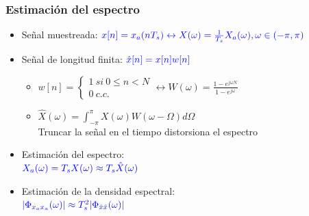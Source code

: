 \begin{frame} 
  \frametitle{Estimación del espectro}

    \begin{itemize}
      \item Señal muestreada: $\color{blue}x[n]=x_a(nT_s) \leftrightarrow X(\omega)=\frac{1}{T_s}X_a(\omega), \omega\in(-\pi,\pi)$ \vspace{0.2cm}
      \item Señal de longitud finita: $\color{blue}\hat{x}[n]=x[n]w[n]\color{black}$ \vspace{0.2cm}
      \begin{itemize}
        \item $w[n]=\left\{ \begin{matrix}1~si~0\leq n< N\\ 0~c.c.\end{matrix} \right. \leftrightarrow W(\omega)=\frac{1-e^{j\omega N}}{1-e^{j\omega}}$
        \item $\hat{X}(\omega)=\int_{-\pi}^{\pi}X(\omega)W(\omega-\Omega)d\Omega$ \\ \vspace{0.1cm}
        \alert{Truncar la señal en el tiempo distorsiona el espectro}
      \end{itemize} \vspace{0.2cm}
      \item Estimación del espectro:\\ $\color{blue}X_a(\omega)=T_s X(\omega)\approx T_s \hat{X}(\omega)\color{black}$ \vspace{0.2cm} 
      \item Estimación de la densidad espectral:\\ $\color{blue}|\Phi_{x_a x_a}(\omega)|\approx T_s^2|\Phi_{\hat{x}\hat{x}}(\omega)|\color{black}$
    \end{itemize}

  
\end{frame}


